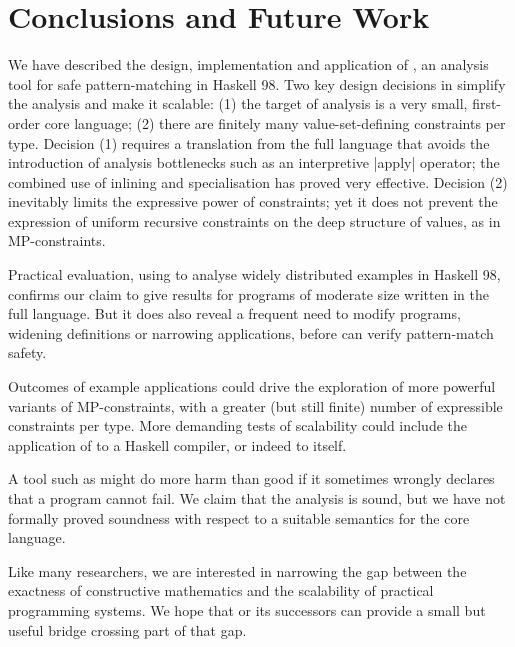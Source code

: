 \section{Conclusions and Future Work}
\label{sec:conclusion}

We have described the design, implementation and application of \catch{},
an analysis tool for safe pattern-matching in Haskell 98.  Two key
design decisions in \catch{} simplify the analysis and make it scalable:
(1) the target of analysis is a very small, first-order core language;
(2) there are finitely many value-set-defining constraints per type.
Decision (1) requires a translation from the full language that avoids
the introduction of analysis bottlenecks such as an interpretive |apply|
operator; the combined use of inlining and specialisation has proved
very effective.  Decision (2) inevitably limits the expressive power of
constraints; yet it does not prevent the expression of uniform recursive
constraints on the deep structure of values, as in MP-constraints.

Practical evaluation, using \catch{} to analyse widely distributed examples
in Haskell 98, confirms our claim to give results for programs of moderate
size written in the full language. But it does also reveal a frequent need
to modify programs, widening definitions or narrowing applications,
before \catch{} can verify pattern-match safety.

Outcomes of example applications could drive the exploration of more
powerful variants of MP-constraints, with a greater (but still finite)
number of expressible constraints per type.  More demanding tests of
scalability could include the application of \catch{} to a Haskell compiler,
or indeed to \catch{} itself.

A tool such as \catch{} might do more harm than good if it sometimes wrongly
declares that a program cannot fail.  We claim that the \catch{} analysis
is sound, but we have not formally proved soundness with respect to a
suitable semantics for the core language.

Like many researchers, we are interested in narrowing the gap between the
exactness of constructive mathematics and the scalability of practical
programming systems.  We hope that \catch{} or its successors can provide
a small but useful bridge crossing part of that gap.
